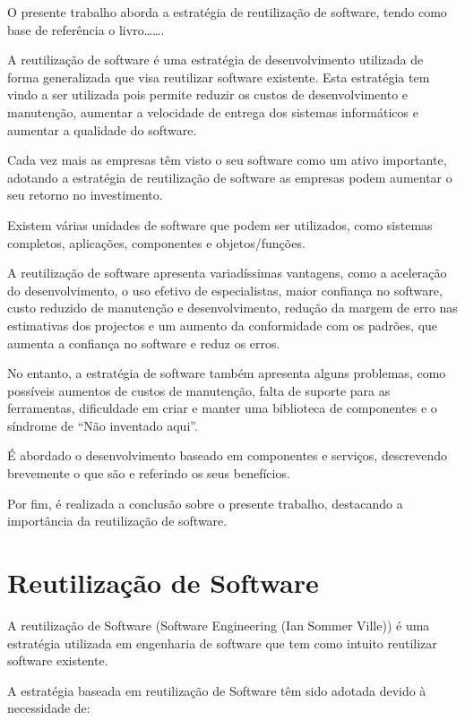 \documentclass[runningheads]{llncs}
\begin{document}
O presente trabalho aborda a estratégia de reutilização de software, tendo como base de referência o livro……. \par
A reutilização de software é uma estratégia de desenvolvimento utilizada de forma generalizada que visa reutilizar software existente. Esta estratégia tem vindo a ser utilizada pois permite reduzir os custos de desenvolvimento e manutenção, aumentar a velocidade de entrega dos sistemas informáticos e aumentar a qualidade do software.\par
Cada vez mais as empresas têm visto o seu software como um ativo importante, adotando a estratégia de reutilização de software as empresas podem aumentar o seu retorno no investimento.\par
Existem várias unidades de software que podem ser utilizados, como sistemas completos, aplicações, componentes e objetos/funções.\par
A reutilização de software apresenta variadíssimas vantagens, como a aceleração do desenvolvimento, o uso efetivo de especialistas, maior confiança no software, custo reduzido de manutenção e desenvolvimento, redução da margem de erro nas estimativas dos projectos e um aumento da conformidade com os padrões, que aumenta a confiança no software e reduz os erros.\par
No entanto, a estratégia de software também apresenta alguns problemas, como possíveis aumentos de custos de manutenção, falta de suporte para as ferramentas, dificuldade em criar e manter uma biblioteca de componentes e o síndrome de “Não inventado aqui”.\par
É abordado o desenvolvimento baseado em componentes e serviços, descrevendo brevemente o que são e referindo os seus benefícios.\par
Por fim, é realizada a conclusão sobre o presente trabalho, destacando a importância da  reutilização de software.\par


\newpage
\section{Reutilização de Software}

A reutilização de Software (Software Engineering (Ian Sommer Ville)) é uma estratégia utilizada em engenharia de software que tem como intuito reutilizar software existente.\par
A estratégia baseada em reutilização de Software têm sido adotada devido à necessidade de:
\end{document}
